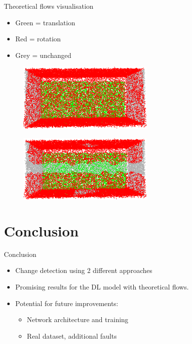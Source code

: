 \documentclass{beamer}
\begin{document}
\begin{frame}{Theoretical flows visualisation}
\begin{minipage}{\textwidth}
    \begin{minipage}{0.3\textwidth}
        \begin{itemize}
            \item Green = translation
            \item Red = rotation
            \item Grey = unchanged
        \end{itemize}
        
    \end{minipage}
    \hfill
    \begin{minipage}{0.7\textwidth}
        \begin{figure}
            \centering
            \includegraphics[width = 0.6\textwidth]{img/Results_nogift_clean.png}
        \end{figure}
        \begin{figure}
            \centering
            \includegraphics[width = 0.6\textwidth]{img/Results_gift_clean.png}
        \end{figure}
    \end{minipage}
\end{minipage}  
\end{frame}

\section[]{Conclusion}
\begin{frame}{Conclusion}
    \begin{itemize}
        \item Change detection using 2 different approaches
        \item Promising results for the DL model with theoretical flows.
        \item Potential for future improvements:
        \begin{itemize}
            \item Network architecture and training
            \item Real dataset, additional faults
        \end{itemize}
    \end{itemize}
\end{frame}
\end{document}
